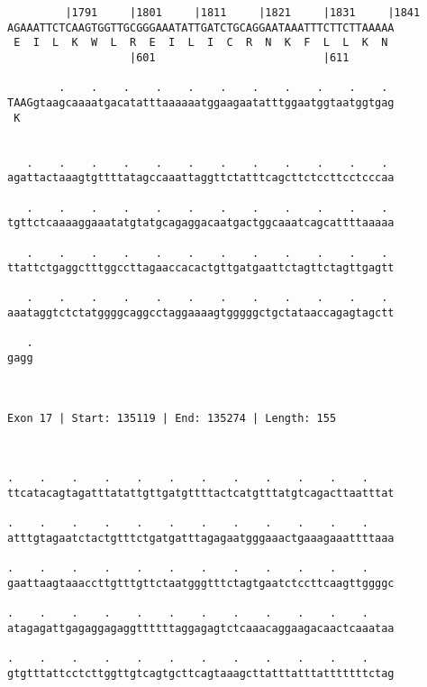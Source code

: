 \documentclass{article}
\begin{document}
\begin{Verbatim}
         |1791     |1801     |1811     |1821     |1831     |1841
AGAAATTCTCAAGTGGTTGCGGGAAATATTGATCTGCAGGAATAAATTTCTTCTTAAAAA
 E  I  L  K  W  L  R  E  I  L  I  C  R  N  K  F  L  L  K  N 
                   |601                          |611       
  
        .    .    .    .    .    .    .    .    .    .    . 
TAAGgtaagcaaaatgacatatttaaaaaatggaagaatatttggaatggtaatggtgag
 K                                                          
                                                            
  
   .    .    .    .    .    .    .    .    .    .    .    . 
agattactaaagtgttttatagccaaattaggttctatttcagcttctccttcctcccaa
                                                            
   .    .    .    .    .    .    .    .    .    .    .    . 
tgttctcaaaaggaaatatgtatgcagaggacaatgactggcaaatcagcattttaaaaa
                                                            
   .    .    .    .    .    .    .    .    .    .    .    . 
ttattctgaggctttggccttagaaccacactgttgatgaattctagttctagttgagtt
                                                            
   .    .    .    .    .    .    .    .    .    .    .    . 
aaataggtctctatggggcaggcctaggaaaagtgggggctgctataaccagagtagctt
                                                            
   .
gagg
    
    
 
Exon 17 | Start: 135119 | End: 135274 | Length: 155



.    .    .    .    .    .    .    .    .    .    .    .    
ttcatacagtagatttatattgttgatgttttactcatgtttatgtcagacttaatttat
                                                            
.    .    .    .    .    .    .    .    .    .    .    .    
atttgtagaatctactgtttctgatgatttagagaatgggaaactgaaagaaattttaaa
                                                            
.    .    .    .    .    .    .    .    .    .    .    .    
gaattaagtaaaccttgtttgttctaatgggtttctagtgaatctccttcaagttggggc
                                                            
.    .    .    .    .    .    .    .    .    .    .    .    
atagagattgagaggagaggttttttaggagagtctcaaacaggaagacaactcaaataa
                                                            
.    .    .    .    .    .    .    .    .    .    .    .    
gtgtttattcctcttggttgtcagtgcttcagtaaagcttatttatttatttttttctag
                                                            

\end{Verbatim}
\end{document}
